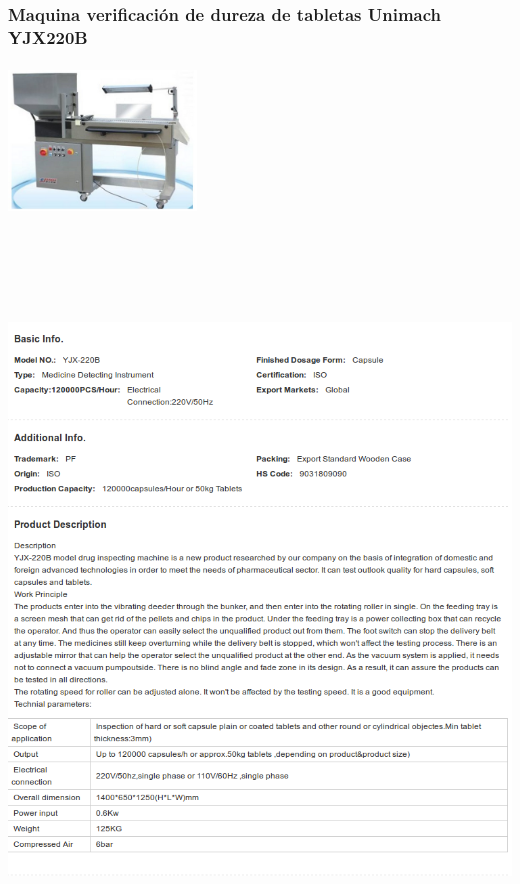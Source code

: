 \subsubsection{Maquina verificación de dureza de tabletas Unimach YJX220B}
\includegraphics[width=5cm,height=4cm,keepaspectratio]{Datasheets/3Foto.png} 
\\
\includegraphics[width=15cm,height=20cm,keepaspectratio]{Datasheets/3MaquinaVerificacion.png} 
\newpage


